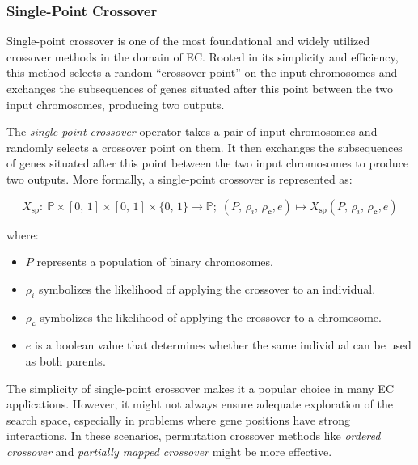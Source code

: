 \subsubsection{Single-Point Crossover}
\label{sec:keen:op:cx:single_point}

  Single-point crossover is one of the most foundational and widely utilized 
  crossover methods in the domain of EC. Rooted in its simplicity and 
  efficiency, this method selects a random \enquote{crossover point} on the 
  input chromosomes and exchanges the subsequences of genes situated after this 
  point between the two input chromosomes, producing two outputs.

  \begin{definition}
    The \textit{single-point crossover} operator takes a pair of input 
    chromosomes and randomly selects a crossover point on them. It then 
    exchanges the subsequences of genes situated after this point between the 
    two input chromosomes to produce two outputs. More formally, a single-point 
    crossover is represented as:

    \begin{equation}
        X_\mathrm{sp} :\: 
            \mathbb{P} \times [0,\, 1] \times [0,\, 1] \times \{0,\, 1\} \rightarrow \mathbb{P};\;
            (P,\, \rho_i,\, \rho_\mathbf{c}, e) \mapsto X_\mathrm{sp}(P,\, \rho_i,\, \rho_\mathbf{c}, e)
    \end{equation}

    where:

    \begin{itemize}
        \item \(P\) represents a population of binary chromosomes.
        \item \(\rho_i\) symbolizes the likelihood of applying the crossover to 
            an individual.
        \item \(\rho_\mathbf{c}\) symbolizes the likelihood of applying the 
            crossover to a chromosome.
        \item \(e\) is a boolean value that determines whether the same individual can be used as both parents.
    \end{itemize}
  \end{definition}

  \begin{remark}
    The simplicity of single-point crossover makes it a popular choice in many 
    EC applications. However, it might not always ensure adequate exploration 
    of the search space, especially in problems where gene positions have 
    strong interactions. In these scenarios, permutation crossover methods like 
    \textit{ordered crossover} and \textit{partially mapped crossover} might be 
    more effective.
  \end{remark}

